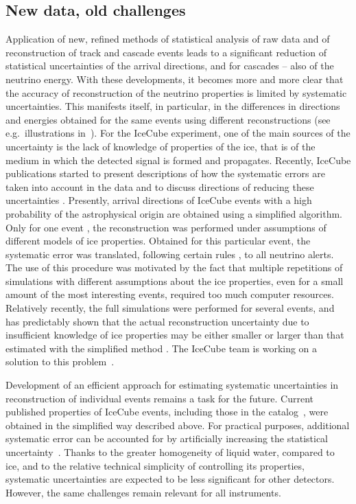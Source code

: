 \documentclass[a4paper,noshowpacs,noshowkeys,floatfix,twocolumn,preprintnumbers,nofootinbib]{revtex4-2}
\begin{document}
\subsection{New data, old challenges}
\label{sec:old-problems}
Application of new, refined methods of statistical analysis of raw data and of reconstruction of track and cascade events leads to a significant reduction of statistical uncertainties of the arrival directions, and for cascades -- also of the neutrino energy. With these developments, it becomes more and more clear that the accuracy of reconstruction of the neutrino properties is limited by systematic uncertainties. This manifests itself, in particular, in the differences in directions and energies obtained for the same events using different reconstructions (see e.g.\ illustrations in~\cite{ST-UFN}). For the IceCube experiment, one of the main sources of the uncertainty is the lack of knowledge of properties of the ice, that is of the medium in which the detected signal is formed and propagates.
Recently, IceCube publications started to present descriptions of how the systematic errors are taken into account in the data and to discuss directions of reducing these uncertainties \cite{Lagunas2021, Lagunas2023, IceCube-TDE-ICRC2023}. Presently, arrival directions of IceCube events with a high probability of the astrophysical origin are obtained using a simplified algorithm. Only for one event \cite{IceCube-event-for-which-syst}, the reconstruction was performed under assumptions of different models of ice properties. Obtained for this particular event, the systematic error was translated, following certain rules \cite{Lagunas2021}, to all neutrino alerts. The use of this procedure was motivated by the fact that multiple repetitions of simulations with different assumptions about the ice properties, even for a small amount of the most interesting events, required too much computer resources. Relatively recently, the full simulations were performed for several events, and has predictably shown that the actual reconstruction uncertainty due to insufficient knowledge of ice properties may be either smaller or larger than that estimated with the simplified method \cite{Lagunas2021}. The IceCube team is working on a solution to this problem~\cite{Lagunas2023}.

Development of an efficient approach for estimating systematic uncertainties in reconstruction of individual events remains a task for the future. Current published properties of IceCube events, including those in the catalog~\cite{IceCat}, were obtained in the simplified way described above. For practical purposes, additional systematic error can be accounted for by artificially increasing the statistical uncertainty~\cite{neutradio1, Resconi-blazars}. Thanks to the greater homogeneity of liquid water, compared to ice, and to the relative technical simplicity of controlling its properties, systematic uncertainties are expected to be less significant for other detectors. However, the same challenges remain relevant for all instruments.
\end{document}
